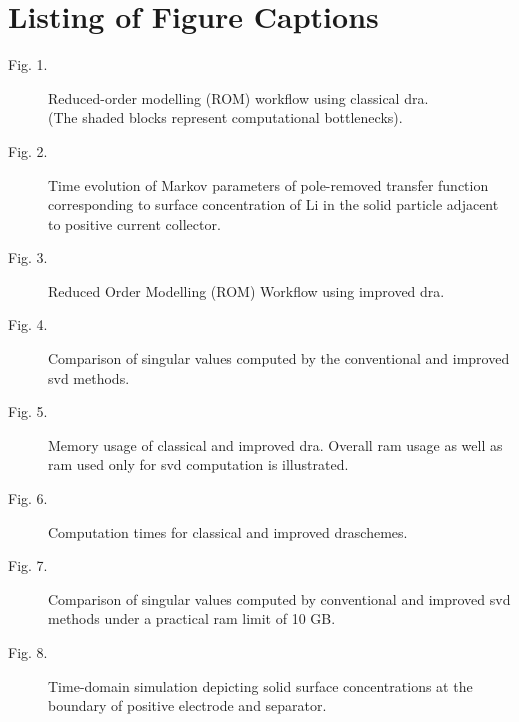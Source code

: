 \section*{Listing of Figure Captions}

\begin{description}
	\item[Fig. 1.]   Reduced-order modelling (ROM) workflow using classical \gls{dra}.\\ (The shaded blocks represent computational bottlenecks).\\
	\item[Fig. 2.]   Time evolution of Markov parameters of pole-removed transfer function corresponding to surface concentration of Li in the solid particle adjacent to positive current collector.\\
	\item[Fig. 3.]   Reduced Order Modelling (ROM) Workflow using improved \gls{dra}.\\
	\item[Fig. 4.]   Comparison of singular values computed by the conventional and improved \gls{svd} methods.\\
	\item[Fig. 5.]	 Memory usage of classical and improved \gls{dra}. Overall \gls{ram} usage as well as \gls{ram} used only for \gls{svd} computation is illustrated.\\
	\item[Fig. 6.] 	 Computation times for classical and improved \gls{dra}schemes.\\
	\item[Fig. 7.]	 Comparison of singular values computed by conventional and improved \gls{svd} methods under a practical \gls{ram} limit of 10 GB.\\
	\item[Fig. 8.]	 Time-domain simulation depicting solid surface concentrations at the boundary of positive electrode and separator.\\
\end{description}



\newpage
\singlespacing

